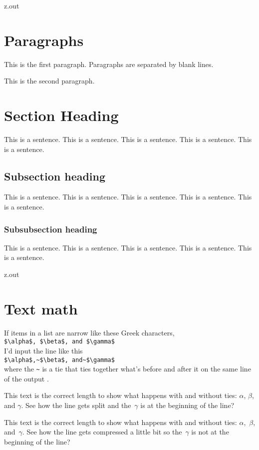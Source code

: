 \begin{VerbatimOut}{z.out}

  
\section{Paragraphs}

This is the first paragraph.
Paragraphs are separated by blank lines.

This is the second paragraph.


\section{Section Heading}

This is a sentence.
This is a sentence.
This is a sentence.
This is a sentence.
This is a sentence.


\subsection{Subsection heading}

This is a sentence.
This is a sentence.
This is a sentence.
This is a sentence.
This is a sentence.


\subsubsection{Subsubsection heading}

This is a sentence.
This is a sentence.
This is a sentence.
This is a sentence.
This is a sentence.
\end{VerbatimOut}

\MyIO



\begin{VerbatimOut}{z.out}


\section{Text math}

If items in a list are narrow like these Greek characters,\\
     \verb+$\alpha$, $\beta$, and $\gamma$+\\
I'd input the line like this\\
     \verb+$\alpha$,~$\beta$, and~$\gamma$+\\
where the \verb+~+ is a tie
that ties together what's before and after it on the same line of the output
\cite[page~92]{knuth2012}.

This text is the correct length to show what happens with and without ties:
$\alpha$,
$\beta$,
and $\gamma$.
See how the line gets split
and the~$\gamma$ is at the beginning of the line?

This text is the correct length to show what happens with and without ties:
$\alpha$,~$\beta$,
and~$\gamma$.
See how the line gets compressed a little bit so the~$\gamma$
is not at the beginning of the line?
\end{VerbatimOut}

\MyIO
